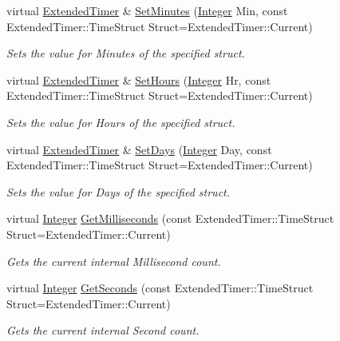 \begin{DoxyCompactItemize}
virtual \hyperlink{classphys_1_1ExtendedTimer}{ExtendedTimer} \& \hyperlink{classphys_1_1ExtendedTimer_a780114f83344b2cd15a558f054b4e8e8}{SetMinutes} (\hyperlink{namespacephys_a7f09bf5585b2bb97613cd9aad4273a81}{Integer} Min, const ExtendedTimer::TimeStruct Struct=ExtendedTimer::Current)
\begin{DoxyCompactList}\small\item\em Sets the value for Minutes of the specified struct. \item\end{DoxyCompactList}\item 
virtual \hyperlink{classphys_1_1ExtendedTimer}{ExtendedTimer} \& \hyperlink{classphys_1_1ExtendedTimer_a33f3d02bdf07073dc4fdf979dd3f68bc}{SetHours} (\hyperlink{namespacephys_a7f09bf5585b2bb97613cd9aad4273a81}{Integer} Hr, const ExtendedTimer::TimeStruct Struct=ExtendedTimer::Current)
\begin{DoxyCompactList}\small\item\em Sets the value for Hours of the specified struct. \item\end{DoxyCompactList}\item 
virtual \hyperlink{classphys_1_1ExtendedTimer}{ExtendedTimer} \& \hyperlink{classphys_1_1ExtendedTimer_a3aeeb90ac4e4b20a59b29fc1ee738141}{SetDays} (\hyperlink{namespacephys_a7f09bf5585b2bb97613cd9aad4273a81}{Integer} Day, const ExtendedTimer::TimeStruct Struct=ExtendedTimer::Current)
\begin{DoxyCompactList}\small\item\em Sets the value for Days of the specified struct. \item\end{DoxyCompactList}\item 
virtual \hyperlink{namespacephys_a7f09bf5585b2bb97613cd9aad4273a81}{Integer} \hyperlink{classphys_1_1ExtendedTimer_a91e0b11c0e77c7eea5152efb5bed9453}{GetMilliseconds} (const ExtendedTimer::TimeStruct Struct=ExtendedTimer::Current)
\begin{DoxyCompactList}\small\item\em Gets the current internal Millisecond count. \item\end{DoxyCompactList}\item 
virtual \hyperlink{namespacephys_a7f09bf5585b2bb97613cd9aad4273a81}{Integer} \hyperlink{classphys_1_1ExtendedTimer_a4b8cd596878863ce9272f0484067c1f3}{GetSeconds} (const ExtendedTimer::TimeStruct Struct=ExtendedTimer::Current)
\begin{DoxyCompactList}\small\item\em Gets the current internal Second count. \item\end{DoxyCompactList}\item 

\end{DoxyCompactItemize}
